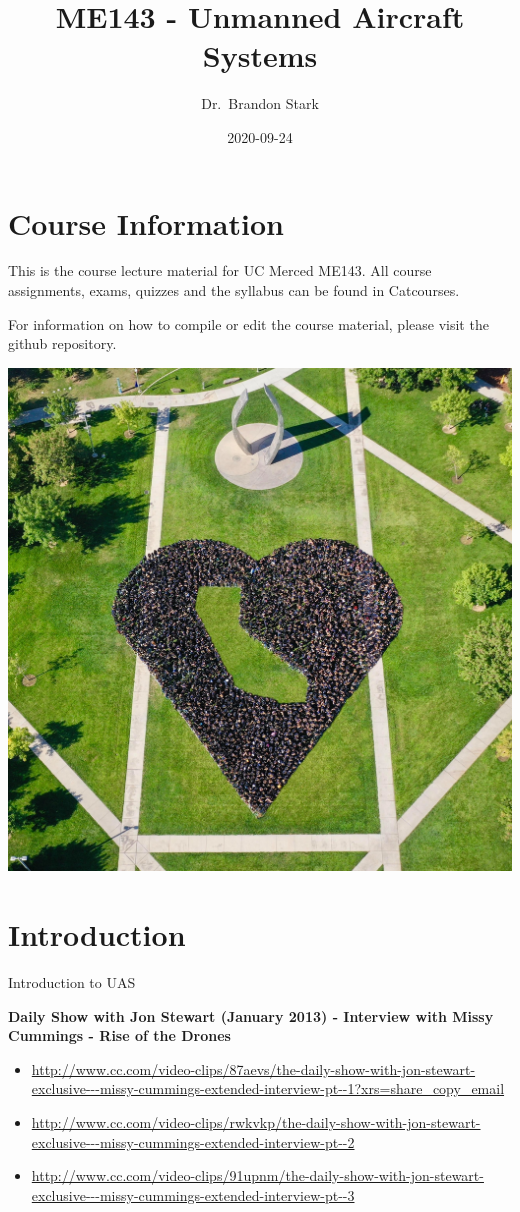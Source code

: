 \documentclass[
]{book}
\title{ME143 - Unmanned Aircraft Systems}
\author{Dr.~Brandon Stark}
\date{2020-09-24}
\providecommand{\tightlist}{%
  \setlength{\itemsep}{0pt}\setlength{\parskip}{0pt}}
\theoremstyle{definition}
\theoremstyle{definition}
\theoremstyle{definition}
\theoremstyle{remark}
\begin{document}
\maketitle

{
\setcounter{tocdepth}{1}
\tableofcontents
}
\hypertarget{course-information}{%
\chapter{Course Information}\label{course-information}}

This is the course lecture material for UC Merced ME143. All course assignments, exams, quizzes and the syllabus can be found in Catcourses.

For information on how to compile or edit the course material, please visit the github repository.

\begin{center}\includegraphics[width=0.5\linewidth]{images/general/UCM_heart} \end{center}

\hypertarget{ch-intro}{%
\chapter{Introduction}\label{ch-intro}}

Introduction to UAS

\textbf{Daily Show with Jon Stewart (January 2013) - Interview with Missy Cummings - Rise of the Drones}

\begin{itemize}
\tightlist
\item
  \url{http://www.cc.com/video-clips/87aevs/the-daily-show-with-jon-stewart-exclusive---missy-cummings-extended-interview-pt--1?xrs=share_copy_email}
\item
  \url{http://www.cc.com/video-clips/rwkvkp/the-daily-show-with-jon-stewart-exclusive---missy-cummings-extended-interview-pt--2}
\item
  \url{http://www.cc.com/video-clips/91upnm/the-daily-show-with-jon-stewart-exclusive---missy-cummings-extended-interview-pt--3}
\end{itemize}
\end{document}
